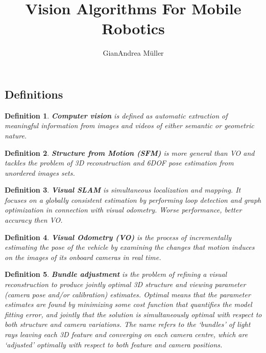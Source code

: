 \documentclass[10pt,a4paper]{scrartcl}
\title{Vision Algorithms For Mobile Robotics}
\author{GianAndrea Müller}
\newtheorem{define}{Definition}
\begin{document}
\begin{multicols*}{4}
\maketitle
\small
\tableofcontents
\normalsize
\end{multicols*}

\begin{multicols*}{2}

\section{Definitions}

\begin{define}
\textbf{Computer vision} is defined as automatic extraction of meaningful information from images and videos of either semantic or geometric nature.
\end{define}

\begin{define}
\textbf{Structure from Motion (SFM)} is more general than VO and tackles the problem of 3D reconstruction and 6DOF pose estimation from unordered images sets.
\end{define}

\begin{define}
\textbf{Visual SLAM} is simultaneous localization and mapping. It focuses on a globally consistent estimation by performing loop detection and graph optimization in connection with visual odometry. Worse performance, better accuracy then VO.

\end{define}

\begin{define}
\textbf{Visual Odometry (VO)} is the process of incrementally estimating the pose of the vehicle by examining the changes that motion induces on the images of its onboard cameras in real time.
\end{define}

\begin{define}
\textbf{Bundle adjustment} is the problem of refining a visual reconstruction to produce jointly optimal
3D structure and viewing parameter (camera pose and/or calibration) estimates. Optimal means that the parameter estimates are found by minimizing some cost function that quantifies the model fitting
error, and jointly that the solution is simultaneously optimal with respect to both structure and camera
variations. The name refers to the ‘bundles’ of light rays leaving each 3D feature and converging on
each camera centre, which are ‘adjusted’ optimally with respect to both feature and camera positions.
\end{define}


\end{multicols*}
\end{document}
